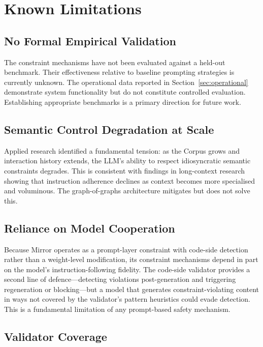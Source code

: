 \documentclass[11pt,a4paper]{article}
\begin{document}
\section{Known Limitations}
\label{sec:limitations}

\subsection{No Formal Empirical Validation}

The constraint mechanisms have not been evaluated against a held-out benchmark.
Their effectiveness relative to baseline prompting strategies is currently unknown.
The operational data reported in Section~\ref{sec:operational} demonstrate system functionality but do not constitute controlled evaluation.
Establishing appropriate benchmarks is a primary direction for future work.

\subsection{Semantic Control Degradation at Scale}

Applied research identified a fundamental tension: as the Corpus grows and interaction history extends, the LLM's ability to respect idiosyncratic semantic constraints degrades.
This is consistent with findings in long-context research showing that instruction adherence declines as context becomes more specialised and voluminous.
The graph-of-graphs architecture mitigates but does not solve this.

\subsection{Reliance on Model Cooperation}

Because Mirror operates as a prompt-layer constraint with code-side detection rather than a weight-level modification, its constraint mechanisms depend in part on the model's instruction-following fidelity.
The code-side validator provides a second line of defence---detecting violations post-generation and triggering regeneration or blocking---but a model that generates constraint-violating content in ways not covered by the validator's pattern heuristics could evade detection.
This is a fundamental limitation of any prompt-based safety mechanism.

\subsection{Validator Coverage}
\end{document}

